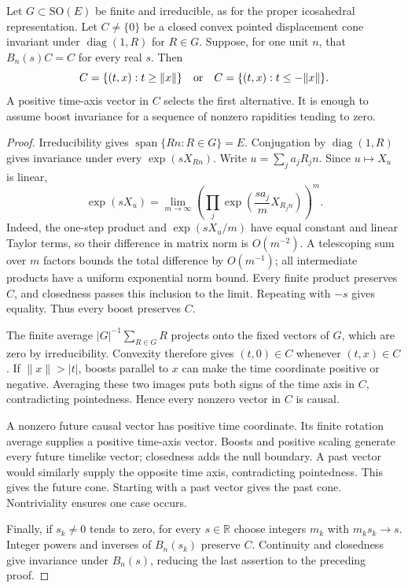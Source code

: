 \begin{theorem}
\label{thm:operational-cone-selection}
Let $G\subset\mathrm{SO}(E)$ be finite and irreducible, as for the proper
icosahedral representation. Let $C\ne\{0\}$ be a closed convex pointed
displacement cone invariant under $\operatorname{diag}(1,R)$ for $R\in G$.
Suppose, for one unit $n$, that $B_n(s)C=C$ for every real $s$. Then
\[
 C=\{(t,x):t\geq\|x\|\}
 \quad\hbox{or}\quad
 C=\{(t,x):t\leq-\|x\|\}.
\]
A positive time-axis vector in $C$ selects the first alternative.
It is enough to assume boost invariance for a sequence of nonzero
rapidities tending to zero.
\end{theorem}
\begin{proof}
Irreducibility gives $\operatorname{span}\{Rn:R\in G\}=E$.
Conjugation by $\operatorname{diag}(1,R)$ gives invariance under every
$\exp(sX_{Rn})$. Write $u=\sum_j a_jR_jn$. Since $u\mapsto X_u$ is linear,
\begin{equation}
 \exp(sX_u)=\lim_{m\to\infty}
 \left(\prod_j\exp\!\left(\frac{s a_j}{m}X_{R_jn}\right)\right)^m.
 \label{eq:operational-boost-product}
\end{equation}
Indeed, the one-step product and $\exp(sX_u/m)$ have equal constant and
linear Taylor terms, so their difference in matrix norm is $O(m^{-2})$.
A telescoping sum over $m$ factors bounds the total difference by
$O(m^{-1})$; all intermediate products have a uniform exponential norm
bound. Every finite product preserves $C$, and closedness passes this
inclusion to the limit. Repeating with $-s$ gives equality. Thus every
boost preserves $C$.

The finite average $|G|^{-1}\sum_{R\in G}R$ projects onto the fixed
vectors of $G$, which are zero by irreducibility. Convexity therefore gives
$(t,0)\in C$ whenever $(t,x)\in C$. If $\|x\|>|t|$, boosts parallel to
$x$ can make the time coordinate positive or negative. Averaging these
two images puts both signs of the time axis in $C$, contradicting
pointedness. Hence every nonzero vector in $C$ is causal.

A nonzero future causal vector has positive time coordinate. Its finite
rotation average supplies a positive time-axis vector. Boosts and positive
scaling generate every future timelike vector; closedness adds the null
boundary. A past vector would similarly supply the opposite time axis,
contradicting pointedness. This gives the future cone. Starting with a
past vector gives the past cone. Nontriviality ensures one case occurs.

Finally, if $s_k\ne0$ tends to zero, for every $s\in\mathbb R$ choose
integers $m_k$ with $m_ks_k\to s$. Integer powers and inverses of
$B_n(s_k)$ preserve $C$. Continuity and closedness give invariance under
$B_n(s)$, reducing the last assertion to the preceding proof.
\end{proof}


